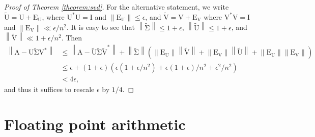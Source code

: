 \documentclass{article}
\newcommand{\lnorm}{\left\|}
\newcommand{\rnorm}{\right\|}
\newcommand{\lpar}{\left(}
\newcommand{\rpar}{\right)}
\newcommand\matA{\boldsymbol{\mathrm{A}}}
\newcommand\matE{\boldsymbol{\mathrm{E}}}
\newcommand\matI{\boldsymbol{\mathrm{I}}}
\newcommand\matU{\boldsymbol{\mathrm{U}}}
\newcommand\matV{\boldsymbol{\mathrm{V}}}
\newcommand\matUtilde{\widetilde{\boldsymbol{\mathrm{U}}}}
\newcommand\matVtilde{\widetilde{\boldsymbol{\mathrm{V}}}}
\newcommand\matSigmatilde{\widetilde{\boldsymbol{\mathrm{\Sigma}}}}
\begin{document}
\begin{proof}[Proof of Theorem \ref{theorem:svd}]
        For the alternative statement, we write $\matUtilde=\matU+\matE_{\matU}$, where $\matU^*\matU=\matI$ and $\|\matE_{\matU}\|\leq \epsilon$, and $\matVtilde=\matV+\matE_{\matV}$ where $\matV^*\matV=\matI$ and $\|\matE_{\matV}\|\ll \epsilon/n^2$.
        It is easy to see that $\lnorm \matSigmatilde \rnorm \leq 1+\epsilon$, $\lnorm \matUtilde\rnorm \leq 1+\epsilon$, and $\lnorm \matVtilde \rnorm \ll 1+\epsilon/n^2$.
        Then
        \begin{align*}
            \lnorm
                \matA - \matU\matSigmatilde\matV^*
            \rnorm
            &\leq
            \lnorm
                \matA - \matUtilde\matSigmatilde\matVtilde^*
            \rnorm
            +
            \lnorm \matSigmatilde \rnorm
            \lpar
                \lnorm
                    \matE_{\matU}
                \rnorm
                \lnorm \matVtilde \rnorm
                +
                \lnorm
                    \matE_{\matV}
                \rnorm
                \lnorm \matUtilde \rnorm
                +
                \lnorm
                    \matE_{\matU}
               \rnorm
                \lnorm \matE_{\matV} \rnorm
            \rpar
            \\
            &\leq
            \epsilon
            +
            (1+\epsilon)
            \lpar
                \epsilon(1+\epsilon/n^2) 
                +
                \epsilon(1+\epsilon)/n^2
                +
                \epsilon^2/n^2
            \rpar
            \\
            &< 4\epsilon,
        \end{align*}
        and thus it suffices to rescale $\epsilon$ by $1/4$.
    \end{proof}







\section{Floating point arithmetic}
\label{appendix:floating_point_arithmetic}
\end{document}
